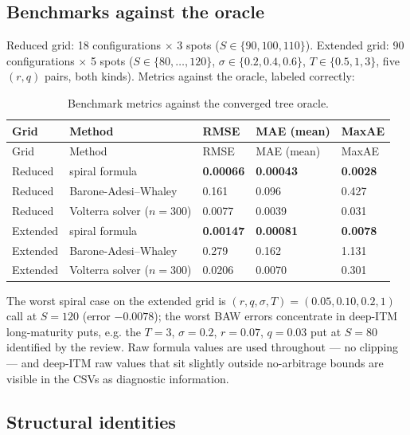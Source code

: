 \documentclass[
  english,
  10pt,
  letterpaper,
  DIV=11,
  numbers=noendperiod]{scrartcl}
\begin{document}
\subsection{Benchmarks against the
oracle}\label{benchmarks-against-the-oracle}

Reduced grid: 18 configurations \(\times\) 3 spots
(\(S\in\{90,100,110\}\)). Extended grid: 90 configurations \(\times\) 5
spots (\(S\in\{80,\ldots,120\}\), \(\sigma\in\{0.2,0.4,0.6\}\),
\(T\in\{0.5,1,3\}\), five \((r,q)\) pairs, both kinds). Metrics against
the oracle, labeled correctly:

\begin{longtable}[]{@{}lllll@{}}
\caption{Benchmark metrics against the converged tree
oracle.}\label{tbl-bench}\tabularnewline
\toprule\noalign{}
Grid & Method & RMSE & MAE (mean) & MaxAE \\
\midrule\noalign{}
\endfirsthead
\toprule\noalign{}
Grid & Method & RMSE & MAE (mean) & MaxAE \\
\midrule\noalign{}
\endhead
\bottomrule\noalign{}
\endlastfoot
Reduced & spiral formula & \textbf{0.00066} & \textbf{0.00043} &
\textbf{0.0028} \\
Reduced & Barone-Adesi--Whaley & 0.161 & 0.096 & 0.427 \\
Reduced & Volterra solver (\(n=300\)) & 0.0077 & 0.0039 & 0.031 \\
Extended & spiral formula & \textbf{0.00147} & \textbf{0.00081} &
\textbf{0.0078} \\
Extended & Barone-Adesi--Whaley & 0.279 & 0.162 & 1.131 \\
Extended & Volterra solver (\(n=300\)) & 0.0206 & 0.0070 & 0.301 \\
\end{longtable}

The worst spiral case on the extended grid is
\((r,q,\sigma,T)=(0.05,0.10,0.2,1)\) call at \(S=120\) (error
\(-0.0078\)); the worst BAW errors concentrate in deep-ITM long-maturity
puts, e.g. the \(T=3\), \(\sigma=0.2\), \(r=0.07\), \(q=0.03\) put at
\(S=80\) identified by the review. Raw formula values are used
throughout --- no clipping --- and deep-ITM raw values that sit slightly
outside no-arbitrage bounds are visible in the CSVs as diagnostic
information.

\subsection{Structural identities}\label{sec-identities}
\end{document}
